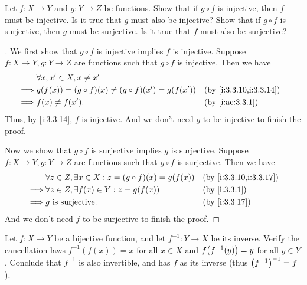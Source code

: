 \begin{ex}\label{i:ex:3.3.5}
  Let \(f : X \to Y\) and \(g : Y \to Z\) be functions.
  Show that if \(g \circ f\) is injective, then \(f\) must be injective.
  Is it true that \(g\) must also be injective?
  Show that if \(g \circ f\) is surjective, then \(g\) must be surjective.
  Is it true that \(f\) must also be surjective?
\end{ex}

\begin{proof}[]
  We first show that \(g \circ f\) is injective implies \(f\) is injective.
  Suppose \(f : X \to Y, g : Y \to Z\) are functions such that \(g \circ f\) is injective.
  Then we have
  \begin{align*}
             & \forall x, x' \in X, x \neq x'                                                       \\
    \implies & g(f(x)) = (g \circ f)(x) \neq (g \circ f)(x') = g(f(x')) &  & \by{i:3.3.10,i:3.3.14} \\
    \implies & f(x) \neq f(x').                                         &  & \by{i:ac:3.3.1}
  \end{align*}
  Thus, by \cref{i:3.3.14}, \(f\) is injective.
  And we don't need \(g\) to be injective to finish the proof.

  Now we show that \(g \circ f\) is surjective implies \(g\) is surjective.
  Suppose \(f : X \to Y, g : Y \to Z\) are functions such that \(g \circ f\) is surjective.
  Then we have
  \begin{align*}
             & \forall z \in Z, \exists x \in X : z = (g \circ f)(x) = g(f(x)) &  & \by{i:3.3.10,i:3.3.17} \\
    \implies & \forall z \in Z, \exists f(x) \in Y : z = g(f(x))               &  & \by{i:3.3.1}           \\
    \implies & g \text{ is surjective}.                                        &  & \by{i:3.3.17}
  \end{align*}
  And we don't need \(f\) to be surjective to finish the proof.
\end{proof}

\begin{ex}\label{i:ex:3.3.6}
  Let \(f : X \to Y\) be a bijective function, and let \(f^{-1} : Y \to X\) be its inverse.
  Verify the cancellation laws \(f^{-1}(f(x)) = x\) for all \(x \in X\) and \(f\pa{f^{-1}(y)} = y\) for all \(y \in Y\).
  Conclude that \(f^{-1}\) is also invertible, and has \(f\) as its inverse (thus \(\left\lparen f^{-1}\right\rparen^{-1} = f\)).
\end{ex}

